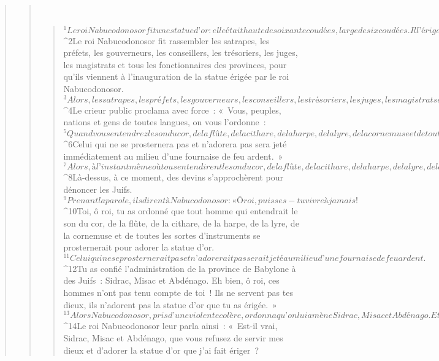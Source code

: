 \begin{verse}
\begin{verse}
         
      \bchapter{}
      \begin{verse}
${}^{1}Le roi Nabucodonosor fit une statue d’or : elle était haute de soixante coudées, large de six coudées. Il l’érigea dans la plaine de Doura, dans la province de Babylone. 
${}^{2}Le roi Nabucodonosor fit rassembler les satrapes, les préfets, les gouverneurs, les conseillers, les trésoriers, les juges, les magistrats et tous les fonctionnaires des provinces, pour qu’ils viennent à l’inauguration de la statue érigée par le roi Nabucodonosor. 
${}^{3}Alors, les satrapes, les préfets, les gouverneurs, les conseillers, les trésoriers, les juges, les magistrats et tous les fonctionnaires des provinces se rassemblèrent pour l’inauguration de la statue qu’avait érigée le roi Nabucodonosor. Ils se tenaient là, debout, devant la statue que le roi Nabucodonosor avait érigée. 
${}^{4}Le crieur public proclama avec force : « Vous, peuples, nations et gens de toutes langues, on vous l’ordonne : 
${}^{5}Quand vous entendrez le son du cor, de la flûte, de la cithare, de la harpe, de la lyre, de la cornemuse et de toutes les sortes d’instruments, vous vous prosternerez et vous adorerez la statue d’or que le roi Nabucodonosor a érigée. 
${}^{6}Celui qui ne se prosternera pas et n’adorera pas sera jeté immédiatement au milieu d’une fournaise de feu ardent. » 
${}^{7}Alors, à l’instant même où tous entendirent le son du cor, de la flûte, de la cithare, de la harpe, de la lyre, de la cornemuse et de toutes les sortes d’instruments, tous les peuples, nations et gens de toutes langues se prosternèrent et adorèrent la statue d’or que le roi Nabucodonosor avait érigée.
${}^{8}Là-dessus, à ce moment, des devins s’approchèrent pour dénoncer les Juifs. 
${}^{9}Prenant la parole, ils dirent à Nabucodonosor : « Ô roi, puisses-tu vivre à jamais ! 
${}^{10}Toi, ô roi, tu as ordonné que tout homme qui entendrait le son du cor, de la flûte, de la cithare, de la harpe, de la lyre, de la cornemuse et de toutes les sortes d’instruments se prosternerait pour adorer la statue d’or. 
${}^{11}Celui qui ne se prosternerait pas et n’adorerait pas serait jeté au milieu d’une fournaise de feu ardent. 
${}^{12}Tu as confié l’administration de la province de Babylone à des Juifs : Sidrac, Misac et Abdénago. Eh bien, ô roi, ces hommes n’ont pas tenu compte de toi ! Ils ne servent pas tes dieux, ils n’adorent pas la statue d’or que tu as érigée. »
${}^{13}Alors Nabucodonosor, pris d’une violente colère, ordonna qu’on lui amène Sidrac, Misac et Abdénago. Et ces hommes furent amenés devant le roi. 
${}^{14}Le roi Nabucodonosor leur parla ainsi : « Est-il vrai, Sidrac, Misac et Abdénago, que vous refusez de servir mes dieux et d’adorer la statue d’or que j’ai fait ériger ? 

\end{verse}
\end{verse}
\end{verse}
